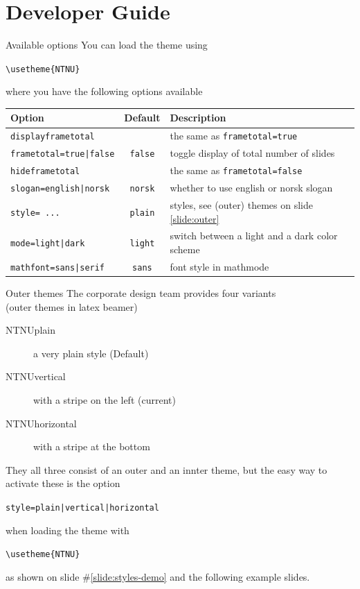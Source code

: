 \documentclass[aspectratio=169]{beamer}
\begin{document}
	\section{Developer Guide}
		\begin{frame}[fragile]{Available options}
			\label{slide:developer}
			You can load the theme using

			\lstinline!\usetheme{NTNU}!

			where you have the following options available

			\begin{tabular}{lcl}
				\toprule
				\textbf{Option} & \textbf{Default} &\textbf{Description} \\
				\midrule
				\lstinline!displayframetotal! && the same as \lstinline!frametotal=true! \\
				\lstinline!frametotal=true|false! & \lstinline!false! & toggle display of total number of slides\\
				\lstinline!hideframetotal! && the same as \lstinline!frametotal=false! \\
				\lstinline!slogan=english|norsk! & \lstinline!norsk! & whether to use english or norsk slogan\\
				\lstinline!style= ...! & \lstinline!plain! & styles, see (outer) themes on slide \ref{slide:outer}\\
				\lstinline!mode=light|dark! & \lstinline!light! & switch between a light and a dark color scheme\\
				\lstinline!mathfont=sans|serif! & \lstinline!sans! & font style in mathmode\\
				\bottomrule
			\end{tabular}
		\end{frame}
		\begin{frame}[fragile]{Outer themes}
			\label{slide:outer}
			The corporate design team provides four variants
			\\\hfill{\small (outer themes in latex beamer)}

			\begin{description}
				\item[NTNUplain] a very plain style (Default)
				\item[NTNUvertical] with a stripe on the left (current)
				\item[NTNUhorizontal] with a stripe at the bottom
			\end{description}

			They all three consist of an outer and an innter theme, but the easy way to activate these is the option

			\lstinline!style=plain|vertical|horizontal!

			when loading the theme with

			\lstinline!\usetheme{NTNU}!

			as shown on slide \#\ref{slide:styles-demo} and the following example slides.
		\end{frame}
\end{document}
